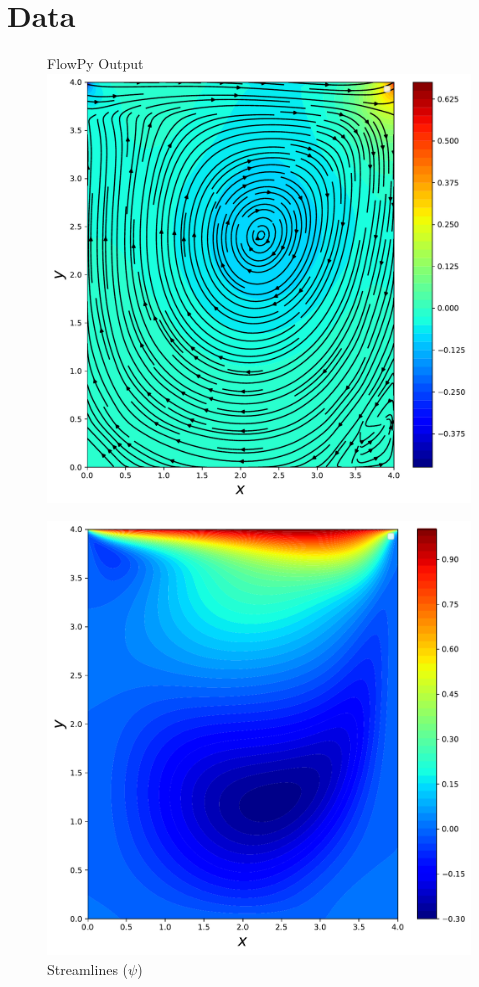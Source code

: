 \documentclass{article}
\begin{document}
\section{Data\label{data}}
\begin{figure}[htb!]
	\centering \large{FlowPy Output} \\
	\includegraphics[width=\linewidth]{./images/Re400FlowPy_pres_stream}
	\caption{Streamlines ($\psi$)}
	\label{fig:pres_example1}
	\endminipage\hfill
	\includegraphics[width=\linewidth]{./images/Re400FlowPy_u}

\end{figure}
\end{document}
